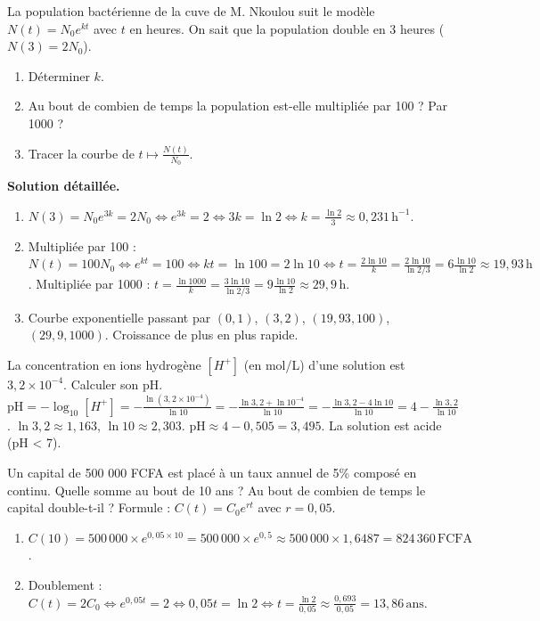 \documentclass[11pt]{article}
\begin{document}
\begin{exoresolu}
La population bactérienne de la cuve de M. Nkoulou suit le modèle $N(t) = N_0 e^{kt}$ avec $t$ en heures. On sait que la population double en 3 heures ($N(3) = 2N_0$).
\begin{enumerate}
    \item Déterminer $k$.
    \item Au bout de combien de temps la population est-elle multipliée par 100 ? Par 1000 ?
    \item Tracer la courbe de $t \mapsto \frac{N(t)}{N_0}$.
\end{enumerate}
\medskip
\noindent\textbf{Solution détaillée.}
\begin{enumerate}
    \item $N(3) = N_0 e^{3k} = 2N_0 \iff e^{3k} = 2 \iff 3k = \ln 2 \iff k = \frac{\ln 2}{3} \approx 0,231\,\text{h}^{-1}$.
    \item Multipliée par 100 : $N(t) = 100 N_0 \iff e^{kt} = 100 \iff kt = \ln 100 = 2\ln 10 \iff t = \frac{2\ln 10}{k} = \frac{2\ln 10}{\ln 2/3} = 6 \frac{\ln 10}{\ln 2} \approx 19,93\,\text{h}$.
    Multipliée par 1000 : $t = \frac{\ln 1000}{k} = \frac{3\ln 10}{\ln 2/3} = 9 \frac{\ln 10}{\ln 2} \approx 29,9\,\text{h}$.
    \item Courbe exponentielle passant par $(0,1)$, $(3,2)$, $(19,93, 100)$, $(29,9, 1000)$. Croissance de plus en plus rapide.
\end{enumerate}
\end{exoresolu}

\begin{exoresolu}
La concentration en ions hydrogène $[H^+]$ (en mol/L) d'une solution est $3,2 \times 10^{-4}$. Calculer son pH.
$\text{pH} = -\log_{10}[H^+] = -\frac{\ln(3,2 \times 10^{-4})}{\ln 10} = -\frac{\ln 3,2 + \ln 10^{-4}}{\ln 10} = -\frac{\ln 3,2 - 4\ln 10}{\ln 10} = 4 - \frac{\ln 3,2}{\ln 10}$.
$\ln 3,2 \approx 1,163$, $\ln 10 \approx 2,303$. $\text{pH} \approx 4 - 0,505 = 3,495$. La solution est acide (pH < 7).
\end{exoresolu}

\begin{exoresolu}
Un capital de 500 000 FCFA est placé à un taux annuel de 5\% composé en continu. Quelle somme au bout de 10 ans ? Au bout de combien de temps le capital double-t-il ?
Formule : $C(t) = C_0 e^{rt}$ avec $r=0,05$.
\begin{enumerate}
    \item $C(10) = 500\,000 \times e^{0,05 \times 10} = 500\,000 \times e^{0,5} \approx 500\,000 \times 1,6487 = 824\,360\,\text{FCFA}$.
    \item Doublement : $C(t) = 2C_0 \iff e^{0,05t} = 2 \iff 0,05t = \ln 2 \iff t = \frac{\ln 2}{0,05} \approx \frac{0,693}{0,05} = 13,86\,\text{ans}$.
\end{enumerate}
\end{exoresolu}
\end{document}
